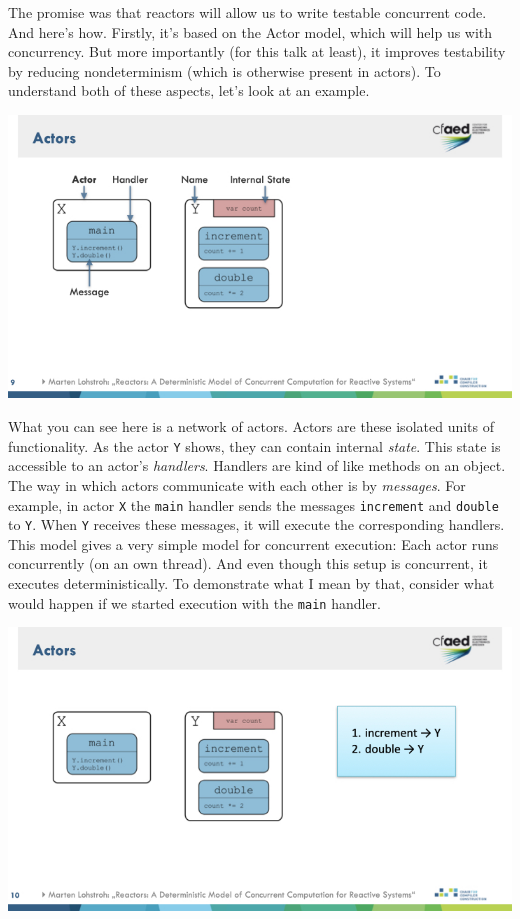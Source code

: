 \documentclass{article}
\begin{document}
The promise was that reactors will allow us to write testable concurrent code.
And here's how.
Firstly, it's based on the Actor model, which will help us with concurrency.
But more importantly (for this talk at least), it improves testability by reducing nondeterminism (which is otherwise present in actors).
To understand both of these aspects, let's look at an example.

\begin{center}
    \includegraphics[width=\columnwidth]{Slides/Slide 9.jpeg}
\end{center}

What you can see here is a network of actors.
Actors are these isolated units of functionality.
As the actor \verb|Y| shows, they can contain internal \emph{state}.
This state is accessible to an actor's \emph{handlers}.
Handlers are kind of like methods on an object.
The way in which actors communicate with each other is by \emph{messages}.
For example, in actor \verb|X| the \verb|main| handler sends the messages \verb|increment| and \verb|double| to \verb|Y|.
When \verb|Y| receives these messages, it will execute the corresponding handlers.
This model gives a very simple model for concurrent execution:
Each actor runs concurrently (on an own thread).
And even though this setup is concurrent, it executes deterministically.
To demonstrate what I mean by that, consider what would happen if we started execution with the \verb|main| handler.

\begin{center}
    \includegraphics[width=\columnwidth]{Slides/Slide 10.jpeg}
\end{center}
\end{document}
